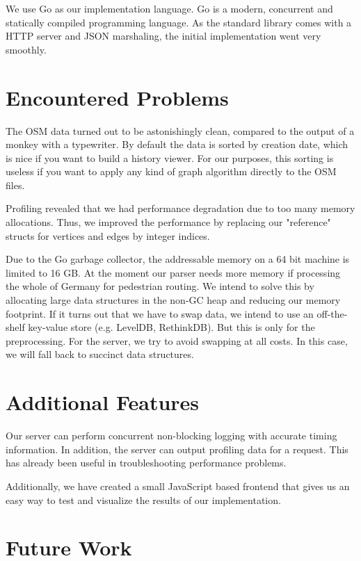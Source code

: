 \documentclass[a4paper]{article}
\begin{document}
We use Go as our implementation language.
Go is a modern, concurrent and statically compiled programming language.
As the standard library comes with a HTTP server and JSON marshaling,
the initial implementation went very smoothly.

\section{Encountered Problems}

The OSM data turned out to be astonishingly clean, compared to the output of a monkey with a typewriter.
By default the data is sorted by creation date, which is nice if you want to build a history viewer.
For our purposes, this sorting is useless if you want to apply any kind of graph algorithm
directly to the OSM files.

Profiling revealed that we had performance degradation due to too many memory allocations.
Thus, we improved the performance by replacing our "reference" structs for vertices and edges by integer indices.

Due to the Go garbage collector, the addressable memory on a 64 bit machine is limited to 16 GB.
At the moment our parser needs more memory if processing the whole of Germany for pedestrian routing.
We intend to solve this by allocating large data structures in the non-GC heap
and reducing our memory footprint.
If it turns out that we have to swap data, we intend to use an off-the-shelf key-value store (e.g. LevelDB, RethinkDB).
But this is only for the preprocessing.
For the server, we try to avoid swapping at all costs.
In this case, we will fall back to succinct data structures.

\section{Additional Features}

Our server can perform concurrent non-blocking logging with accurate timing information.
In addition, the server can output profiling data for a request.
This has already been useful in troubleshooting performance problems.

Additionally, we have created a small JavaScript based frontend that 
gives us an easy way to test and visualize the results of our implementation.

\section{Future Work}
\end{document}
